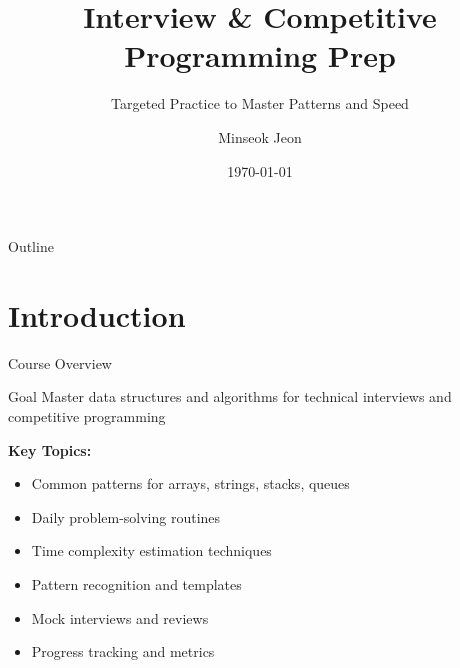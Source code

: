 \documentclass[aspectratio=169,xcolor=dvipsnames]{beamer}
\title{Interview \& Competitive Programming Prep}
\subtitle{Targeted Practice to Master Patterns and Speed}
\author{Minseok Jeon}
\institute{DGIST}
\date{\today}
\begin{document}
\begin{frame}
  \titlepage
\end{frame}

\begin{frame}{Outline}
  \tableofcontents
\end{frame}

\section{Introduction}

\begin{frame}{Course Overview}
  \begin{block}{Goal}
    Master data structures and algorithms for technical interviews and competitive programming
  \end{block}

  \vspace{0.3cm}
  \textbf{Key Topics:}
  \begin{itemize}
    \item Common patterns for arrays, strings, stacks, queues
    \item Daily problem-solving routines
    \item Time complexity estimation techniques
    \item Pattern recognition and templates
    \item Mock interviews and reviews
    \item Progress tracking and metrics
  \end{itemize}
\end{frame}
\end{document}
